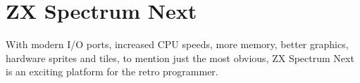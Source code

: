 \chapter{ZX Spectrum Next}



With modern I/O ports, increased CPU speeds, more memory, better graphics, hardware sprites and tiles, to mention just the most obvious, ZX Spectrum Next is an exciting platform for the retro programmer.

~ %

\ChapterTOC

\pagebreak
\thispagestyle{plain} %
\IntentionallyEmpty
\pagebreak
